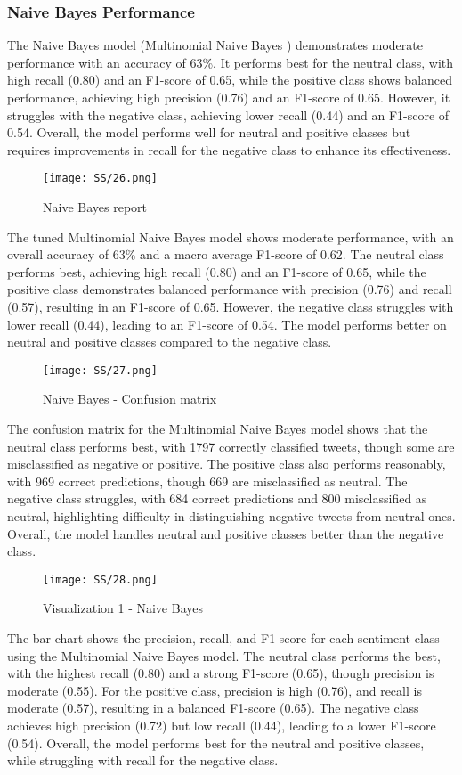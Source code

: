 \documentclass[journal]{IEEEtran}
\begin{document}
\subsubsection*{\textbf{Naive Bayes Performance}}
The Naive Bayes model (Multinomial Naive Bayes ) demonstrates moderate performance with an accuracy of 63\%. It performs best for the neutral class, with high recall (0.80) and an F1-score of 0.65, while the positive class shows balanced performance, achieving high precision (0.76) and an F1-score of 0.65. However, it struggles with the negative class, achieving lower recall (0.44) and an F1-score of 0.54. Overall, the model performs well for neutral and positive classes but requires improvements in recall for the negative class to enhance its effectiveness.

\begin{figure}[H]
\centering
\texttt{[image: SS/26.png]}
\caption{Naive Bayes report}
\end{figure}
The tuned Multinomial Naive Bayes model shows moderate performance, with an overall accuracy of 63\% and a macro average F1-score of 0.62. The neutral class performs best, achieving high recall (0.80) and an F1-score of 0.65, while the positive class demonstrates balanced performance with precision (0.76) and recall (0.57), resulting in an F1-score of 0.65. However, the negative class struggles with lower recall (0.44), leading to an F1-score of 0.54. The model performs better on neutral and positive classes compared to the negative class.
\begin{figure}[H]
\centering
\texttt{[image: SS/27.png]}
\caption{Naive Bayes - Confusion matrix}
\end{figure}

The confusion matrix for the Multinomial Naive Bayes model shows that the neutral class performs best, with 1797 correctly classified tweets, though some are misclassified as negative or positive. The positive class also performs reasonably, with 969 correct predictions, though 669 are misclassified as neutral. The negative class struggles, with 684 correct predictions and 800 misclassified as neutral, highlighting difficulty in distinguishing negative tweets from neutral ones. Overall, the model handles neutral and positive classes better than the negative class.
\begin{figure}[H]
\centering
\texttt{[image: SS/28.png]}
\caption{Visualization 1 - Naive Bayes}
\end{figure}
The bar chart shows the precision, recall, and F1-score for each sentiment class using the Multinomial Naive Bayes model. The neutral class performs the best, with the highest recall (0.80) and a strong F1-score (0.65), though precision is moderate (0.55). For the positive class, precision is high (0.76), and recall is moderate (0.57), resulting in a balanced F1-score (0.65). The negative class achieves high precision (0.72) but low recall (0.44), leading to a lower F1-score (0.54). Overall, the model performs best for the neutral and positive classes, while struggling with recall for the negative class.
\end{document}
